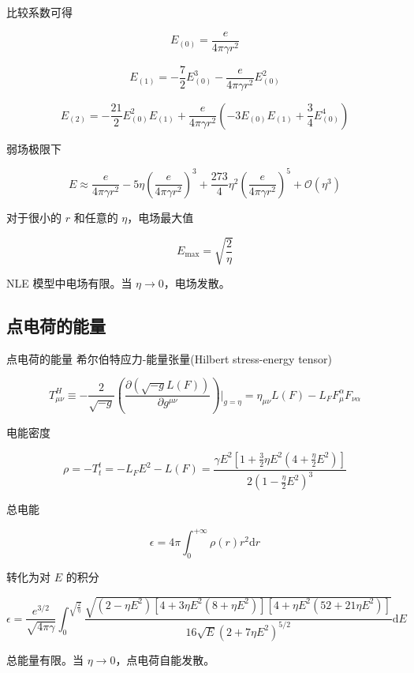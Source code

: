\documentclass[9pt, dvipsnames]{beamer} %
\begin{document}
\begin{frame}
    比较系数可得
    
    $$
    E_{(0)}
    =\frac{e }{4\pi\gamma r^2 }
    $$
    
    $$
    E_{(1)} 
    =-\frac{7 }{2 } E_{(0)}^3 - \frac{e }{4\pi \gamma r^2 } E_{(0)}^2
    $$
    
    $$
    E_{(2)}
    =-\frac{21 }{2 } E_{(0)}^2 E_{(1)} + \frac{e }{4\pi\gamma r^2 } \left(-3E_{(0)}E_{(1)} + \frac{3 }{4 } E_{(0)}^4 \right)
    $$
    
    弱场极限下
    
    $$
    E
    \approx \frac{e }{4\pi\gamma r^2 } - 5\eta\left(\frac{e }{4\pi\gamma r^2 }  \right)^3 + \frac{273 }{4 } \eta^2\left(\frac{e }{4\pi\gamma r^2 }  \right)^5 + \mathcal{O}\left(\eta^3 \right)
    $$
    
    对于很小的 $r$ 和任意的 $\eta$，电场最大值
    
    $$
    E_{\max}
    =\sqrt{\frac{2 }{\eta } }
    $$
    
    NLE 模型中电场有限。当 $\eta\to 0 $，电场发散。
    
\end{frame}

\subsection{点电荷的能量}

\begin{frame}{点电荷的能量}
    希尔伯特应力-能量张量(Hilbert stress-energy tensor)

    $$
    T_{\mu\nu}^H
    \equiv -\frac{2 }{\sqrt{-g} } \left(\frac{\partial \left(\sqrt{-g}L(F) \right) }{\partial g^{\mu\nu} }  \right)\bigg|_{g=\eta}
    =\eta_{\mu\nu}L(F) - L_FF_\mu^\alpha F_{\nu\alpha}
    $$
    
    电能密度
    
    $$
    \rho
    =-T_t^t
    =-L_FE^2-L(F)
    =\frac{\gamma E^2\left[1+\frac{3 }{2 } \eta E^2 \left(4+\frac{\eta }{2 } E^2 \right) \right] }{2\left(1-\frac{\eta }{2 } E^2 \right)^3 } 
    $$
    
    总电能
    
    $$
    \epsilon
    =4\pi\int_{0}^{+\infty} \rho(r)r^2\mathrm{d}r
    $$ 
    
    转化为对 $E $ 的积分
    
    $$
    \epsilon
    =\frac{e^{3/2} }{\sqrt{4\pi\gamma} } \int_{0}^{\sqrt{\frac{2 }{\eta  } }} \frac{\sqrt{\left(2-\eta E^2 \right)\left[4+3\eta E^2\left(8+\eta E^2 \right) \right]\left[4+\eta E^2\left(52+21\eta E^2 \right) \right]} }{16\sqrt{E}\left(2+7\eta E^2 \right)^{5/2} } \mathrm{d}E
    $$
    
    总能量有限。当 $\eta\to 0$，点电荷自能发散。
\end{frame}
\end{document}

